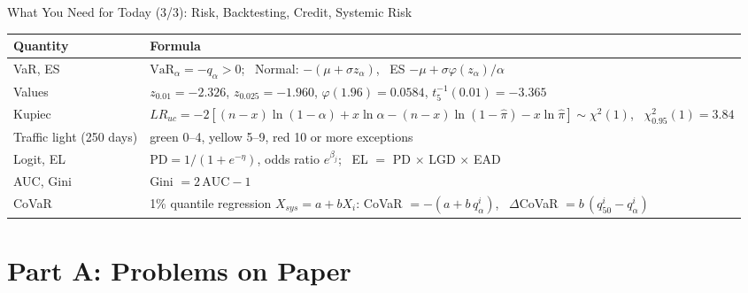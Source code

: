 \begin{frame}{What You Need for Today (3/3): Risk, Backtesting, Credit, Systemic Risk}
\itemsize{\small}
{\renewcommand{\arraystretch}{1.3}\begin{center}
\footnotesize
\begin{tabular}{ll}
\toprule
\textbf{Quantity} & \textbf{Formula} \\
\midrule
VaR, ES & $\mathrm{VaR}_\alpha = -q_\alpha > 0$; \ Normal: $-(\mu + \sigma z_\alpha)$, \ ES $-\mu + \sigma\varphi(z_\alpha)/\alpha$ \\
Values & $z_{0.01} = -2.326$, $z_{0.025} = -1.960$, $\varphi(1.96) = 0.0584$, $t_5^{-1}(0.01) = -3.365$ \\
Kupiec & $LR_{uc} = -2[(n - x)\ln(1 - \alpha) + x\ln\alpha - (n - x)\ln(1 - \hat\pi) - x\ln\hat\pi] \sim \chi^2(1)$, \ $\chi^2_{0.95}(1) = 3.84$ \\
Traffic light (250 days) & green 0--4, yellow 5--9, red 10 or more exceptions \\
Logit, EL & $\mathrm{PD} = 1/(1 + e^{-\eta})$, odds ratio $e^{\beta_j}$; \ EL $=$ PD $\times$ LGD $\times$ EAD \\
AUC, Gini & Gini $= 2\,\mathrm{AUC} - 1$ \\
CoVaR & 1\% quantile regression $X_{sys} = a + bX_i$: CoVaR $= -(a + b\,q_\alpha^i)$, \ $\Delta$CoVaR $= b\,(q_{50}^i - q_\alpha^i)$ \\
\bottomrule
\end{tabular}
\end{center}
}
\end{frame}


\section{Part A: Problems on Paper}

